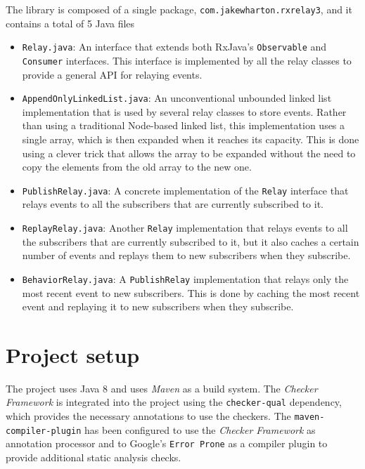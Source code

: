 \documentclass[a4paper, 11pt]{article}
\begin{document}
The library is composed of a single package, \texttt{com.jakewharton.rxrelay3}, and it contains a total of 5 Java files

\begin{itemize}
    \item \texttt{Relay.java}: An interface that extends both RxJava's \texttt{Observable} and \texttt{Consumer} interfaces. This interface is implemented by all the relay classes to provide a general API for relaying events.

    \item \texttt{AppendOnlyLinkedList.java}: An unconventional unbounded linked list implementation that is used by several relay classes to store events. Rather than using a traditional Node-based linked list, this implementation uses a single array, which is then expanded when it reaches its capacity. This is done using a clever trick that allows the array to be expanded without the need to copy the elements from the old array to the new one.

    \item \texttt{PublishRelay.java}: A concrete implementation of the \texttt{Relay} interface that relays events to all the subscribers that are currently subscribed to it.

    \item \texttt{ReplayRelay.java}: Another \texttt{Relay} implementation that relays events to all the subscribers that are currently subscribed to it, but it also caches a certain number of events and replays them to new subscribers when they subscribe.

    \item \texttt{BehaviorRelay.java}: A \texttt{PublishRelay} implementation that relays only the most recent event to new subscribers. This is done by caching the most recent event and replaying it to new subscribers when they subscribe.
\end{itemize}

\pagebreak

\section{Project setup}

The project uses Java 8 and uses \textit{Maven} as a build system. The \textit{Checker Framework} is integrated into the project using the \texttt{checker-qual} dependency, which provides the necessary annotations to use the checkers. The \texttt{maven-compiler-plugin} has been configured to use the \textit{Checker Framework} as annotation processor and to Google's \texttt{Error Prone} as a compiler plugin to provide additional static analysis checks.
\end{document}
